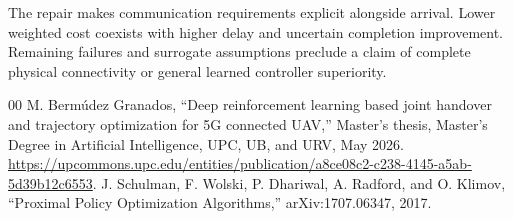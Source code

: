 \documentclass[conference]{IEEEtran}
\begin{document}
The repair makes communication requirements explicit alongside arrival.
Lower weighted cost coexists with higher delay and uncertain completion
improvement. Remaining failures and surrogate assumptions preclude a claim of
complete physical connectivity or general learned controller superiority.

\begin{thebibliography}{00}
 M. Berm\'udez Granados, ``Deep reinforcement learning based joint
handover and trajectory optimization for 5G connected UAV,'' Master's thesis,
Master's Degree in Artificial Intelligence, UPC, UB, and URV, May 2026.
\url{https://upcommons.upc.edu/entities/publication/a8ce08c2-c238-4145-a5ab-5d39b12c6553}.
 J. Schulman, F. Wolski, P. Dhariwal, A. Radford, and O. Klimov,
``Proximal Policy Optimization Algorithms,'' arXiv:1707.06347, 2017.
\end{thebibliography}
\end{document}
